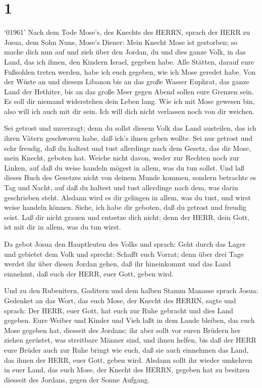 \hypertarget{section}{%
\section{1}\label{section}}

 `01961' Nach dem Tode Mose's, des Knechts des HERRN, sprach
der HERR zu Josua, dem Sohn Nuns, Mose's Diener:  Mein
Knecht Mose ist gestorben; so mache dich nun auf und zieh über den
Jordan, du und dies ganze Volk, in das Land, das ich ihnen, den Kindern
Israel, gegeben habe.  Alle Stätten, darauf eure Fußsohlen
treten werden, habe ich euch gegeben, wie ich Mose geredet habe.
 Von der Wüste an und diesem Libanon bis an das große Wasser
Euphrat, das ganze Land der Hethiter, bis an das große Meer gegen Abend
sollen eure Grenzen sein.  Es soll dir niemand widerstehen
dein Leben lang. Wie ich mit Mose gewesen bin, also will ich auch mit
dir sein. Ich will dich nicht verlassen noch von dir weichen.

 Sei getrost und unverzagt; denn du sollst diesem Volk das
Land austeilen, das ich ihren Vätern geschworen habe, daß ich's ihnen
geben wollte.  Sei nur getrost und sehr freudig, daß du
haltest und tust allerdinge nach dem Gesetz, das dir Mose, mein Knecht,
geboten hat. Weiche nicht davon, weder zur Rechten noch zur Linken, auf
daß du weise handeln mögest in allem, was du tun sollst. 
Und laß dieses Buch des Gesetzes nicht von deinem Munde kommen, sondern
betrachte es Tag und Nacht, auf daß du haltest und tust allerdinge nach
dem, was darin geschrieben steht. Alsdann wird es dir gelingen in allem,
was du tust, und wirst weise handeln können.  Siehe, ich
habe dir geboten, daß du getrost und freudig seist. Laß dir nicht grauen
und entsetze dich nicht; denn der HERR, dein Gott, ist mit dir in allem,
was du tun wirst.

 Da gebot Josua den Hauptleuten des Volks und sprach:
 Geht durch das Lager und gebietet dem Volk und sprecht:
Schafft euch Vorrat; denn über drei Tage werdet ihr über diesen Jordan
gehen, daß ihr hineinkommt und das Land einnehmt, daß euch der HERR,
euer Gott, geben wird.

 Und zu den Rubenitern, Gaditern und dem halben Stamm
Manasse sprach Josua:  Gedenket an das Wort, das euch Mose,
der Knecht des HERRN, sagte und sprach: Der HERR, euer Gott, hat euch
zur Ruhe gebracht und dies Land gegeben.  Eure Weiber und
Kinder und Vieh laßt in dem Lande bleiben, das euch Mose gegeben hat,
diesseit des Jordans; ihr aber sollt vor euren Brüdern her ziehen
gerüstet, was streitbare Männer sind, und ihnen helfen, 
bis daß der HERR eure Brüder auch zur Ruhe bringt wie euch, daß sie auch
einnehmen das Land, das ihnen der HERR, euer Gott, geben wird. Alsdann
sollt ihr wieder umkehren in euer Land, das euch Mose, der Knecht des
HERRN, gegeben hat zu besitzen diesseit des Jordans, gegen der Sonne
Aufgang.


